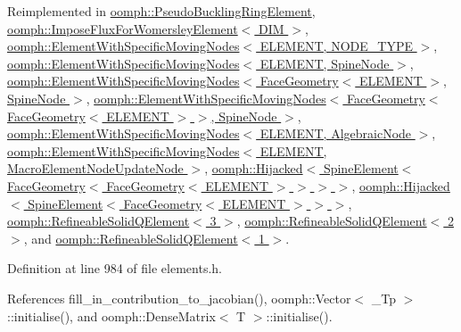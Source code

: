 Reimplemented in \hyperlink{classoomph_1_1PseudoBucklingRingElement_afa1eca6b17521ac4e9ca4367a695f500}{oomph\+::\+Pseudo\+Buckling\+Ring\+Element}, \hyperlink{classoomph_1_1ImposeFluxForWomersleyElement_a7c5c2bbd9577949c1fa78395930fd764}{oomph\+::\+Impose\+Flux\+For\+Womersley\+Element$<$ D\+I\+M $>$}, \hyperlink{classoomph_1_1ElementWithSpecificMovingNodes_ad6f4748cbd652a05cf2bff03549e5aaa}{oomph\+::\+Element\+With\+Specific\+Moving\+Nodes$<$ E\+L\+E\+M\+E\+N\+T, N\+O\+D\+E\+\_\+\+T\+Y\+P\+E $>$}, \hyperlink{classoomph_1_1ElementWithSpecificMovingNodes_ad6f4748cbd652a05cf2bff03549e5aaa}{oomph\+::\+Element\+With\+Specific\+Moving\+Nodes$<$ E\+L\+E\+M\+E\+N\+T, Spine\+Node $>$}, \hyperlink{classoomph_1_1ElementWithSpecificMovingNodes_ad6f4748cbd652a05cf2bff03549e5aaa}{oomph\+::\+Element\+With\+Specific\+Moving\+Nodes$<$ Face\+Geometry$<$ E\+L\+E\+M\+E\+N\+T $>$, Spine\+Node $>$}, \hyperlink{classoomph_1_1ElementWithSpecificMovingNodes_ad6f4748cbd652a05cf2bff03549e5aaa}{oomph\+::\+Element\+With\+Specific\+Moving\+Nodes$<$ Face\+Geometry$<$ Face\+Geometry$<$ E\+L\+E\+M\+E\+N\+T $>$ $>$, Spine\+Node $>$}, \hyperlink{classoomph_1_1ElementWithSpecificMovingNodes_ad6f4748cbd652a05cf2bff03549e5aaa}{oomph\+::\+Element\+With\+Specific\+Moving\+Nodes$<$ E\+L\+E\+M\+E\+N\+T, Algebraic\+Node $>$}, \hyperlink{classoomph_1_1ElementWithSpecificMovingNodes_ad6f4748cbd652a05cf2bff03549e5aaa}{oomph\+::\+Element\+With\+Specific\+Moving\+Nodes$<$ E\+L\+E\+M\+E\+N\+T, Macro\+Element\+Node\+Update\+Node $>$}, \hyperlink{classoomph_1_1Hijacked_a35778dccc9cf036c37ee569efe5b5f7c}{oomph\+::\+Hijacked$<$ Spine\+Element$<$ Face\+Geometry$<$ Face\+Geometry$<$ E\+L\+E\+M\+E\+N\+T $>$ $>$ $>$ $>$}, \hyperlink{classoomph_1_1Hijacked_a35778dccc9cf036c37ee569efe5b5f7c}{oomph\+::\+Hijacked$<$ Spine\+Element$<$ Face\+Geometry$<$ E\+L\+E\+M\+E\+N\+T $>$ $>$ $>$}, \hyperlink{classoomph_1_1RefineableSolidQElement_3_013_01_4_a305f594f84be7336b1bd63bc5c8f2d35}{oomph\+::\+Refineable\+Solid\+Q\+Element$<$ 3 $>$}, \hyperlink{classoomph_1_1RefineableSolidQElement_3_012_01_4_a9f9e21efe69a7bc8f47a227630ae94a9}{oomph\+::\+Refineable\+Solid\+Q\+Element$<$ 2 $>$}, and \hyperlink{classoomph_1_1RefineableSolidQElement_3_011_01_4_a61a037cc3669af9204c9fa764e5c7081}{oomph\+::\+Refineable\+Solid\+Q\+Element$<$ 1 $>$}.



Definition at line 984 of file elements.\+h.



References fill\+\_\+in\+\_\+contribution\+\_\+to\+\_\+jacobian(), oomph\+::\+Vector$<$ \+\_\+\+Tp $>$\+::initialise(), and oomph\+::\+Dense\+Matrix$<$ T $>$\+::initialise().



